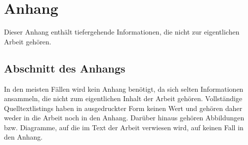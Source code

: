 
\chapter{Anhang}

Dieser Anhang enthält tiefergehende Informationen, die nicht zur eigentlichen Arbeit gehören.

\section{Abschnitt des Anhangs}

In den meisten Fällen wird kein Anhang benötigt, da sich selten Informationen ansammeln, die nicht zum eigentlichen Inhalt der Arbeit gehören. Vollständige Quelltextlistings haben in ausgedruckter Form keinen Wert und gehören daher weder in die Arbeit noch in den Anhang. Darüber hinaus gehören Abbildungen bzw. Diagramme, auf die im Text der Arbeit verwiesen wird, auf keinen Fall in den Anhang.